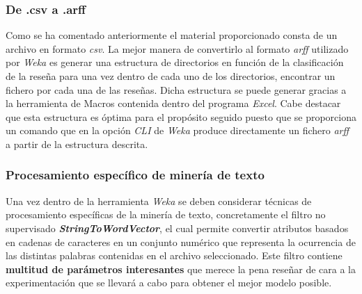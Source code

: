 \documentclass[12pt,a4paper, xcolor=table]{article}
\begin{document}
        \subsubsection{De .csv a .arff}

          Como se ha comentado anteriormente el material proporcionado consta de un archivo en formato \textit{csv}. La mejor manera de convertirlo al formato \textit{arff} utilizado por \textit{Weka} es generar una estructura de directorios en función de la clasificación de la reseña para una vez dentro de cada uno de los directorios, encontrar un fichero por cada una de las reseñas. Dicha estructura se puede generar gracias a la herramienta de Macros contenida dentro del programa \textit{Excel}. Cabe destacar que esta estructura es óptima para el propósito seguido puesto que se proporciona un comando que en la opción \textit{CLI} de \textit{Weka} produce directamente un fichero \textit{arff} a partir de la estructura descrita.

        \subsubsection{Procesamiento específico de minería de texto}
          Una vez dentro de la herramienta \textit{Weka} se deben considerar técnicas de procesamiento específicas de la minería de texto, concretamente el filtro no supervisado \textbf{\textit{StringToWordVector}}, el cual permite convertir atributos basados en cadenas de caracteres en un conjunto numérico que representa la ocurrencia de las distintas palabras contenidas en el archivo seleccionado. Este filtro contiene \textbf{multitud de parámetros interesantes }que merece la pena reseñar de cara a la experimentación que se llevará a cabo para obtener el mejor modelo posible.
\end{document}
